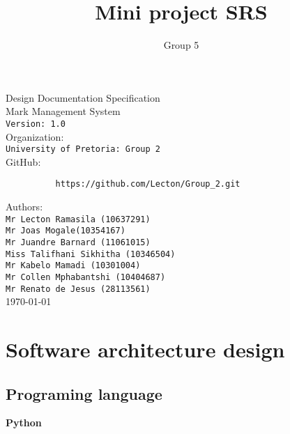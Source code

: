 \documentclass[10pt,a4paper]{article}
\author{Group 5}
\title{Mini project SRS}
\begin{document}
\begin{titlepage}
\begin{center}

\huge Design Documentation Specification\\[0.15cm]
\huge Mark Management System\\[0.15cm]
\large \texttt{Version: 1.0}\\[1cm]

Organization:\\
\texttt{University of Pretoria: Group 2}\\[0.5cm]
GitHub:\\[0.01cm]
\begin{verbatim}
          https://github.com/Lecton/Group_2.git
\end{verbatim}

Authors:\\
\texttt{Mr Lecton Ramasila (10637291)\\
        Mr Joas Mogale(10354167)\\
        Mr Juandre Barnard  (11061015)\\
        Miss Talifhani Sikhitha (10346504)\\
        Mr Kabelo Mamadi (10301004)\\
        Mr Collen Mphabantshi (10404687)\\
        Mr Renato de Jesus (28113561)}\\[1cm]
        
\today
\end{center}
\end{titlepage}


\tableofcontents
\pagebreak
\section{Software architecture design}

\subsection{Programing language}
\textbf{Python}
\end{document}
